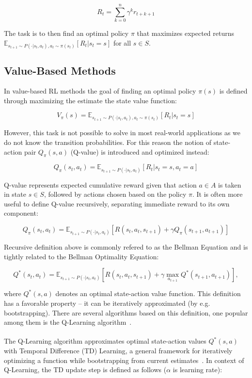 $$R_t = \sum\limits_{k=0}^n \gamma^k r_{t+k+1}$$

\noindent The task is to then find an optimal policy $\pi$ that maximizes expected returns $\mathbb{E}_{s_{t+1} \sim P(\cdot|s_t,a_t), a_t \sim \pi(s_t)}[R_t|s_t = s]$ for all $s \in S$.

\subsection{Value-Based Methods} \label{vbm}

In value-based RL methods the goal of finding an optimal policy $\pi(s)$ is defined through maximizing the estimate the state value function: 

$$V_\pi(s) = \mathbb{E}_{s_{t+1} \sim P(\cdot|s_t,a_t), a_t \sim \pi(s_t)}[R_t|s_t = s]$$

\noindent However, this task is not possible to solve in most real-world applications as we do not know the transition probabilities. For this reason the notion of state-action pair $Q_\pi(s,a)$ (Q-value) is introduced and optimized instead:

$$Q_\pi(s_t,a_t) = \mathbb{E}_{s_{t+1} \sim P(\cdot|s_t,a_t)}[R_t|s_t = s, a_t = a]$$

\noindent Q-value represents expected cumulative reward given that action $a \in A$ is taken in state $s \in S$, followed by actions chosen based on the policy $\pi$. It is often more useful to define Q-value recursively, separating immediate reward to its own component:

$$Q_\pi(s_t, a_t) = \mathbb{E}_{s_{t+1} \sim P(\cdot|s_t,a_t)}[R(s_t, a_t, s_{t+1}) + \gamma Q_\pi(s_{t+1}, a_{t+1})]$$

\noindent Recursive definition above is commonly refered to as the Bellman Equation and is tightly related to the Bellman Optimality Equation:

$$Q^*(s_t, a_t) = \mathbb{E}_{s_{t+1} \sim P(\cdot|s_t,a_t)}[R(s_t, a_t, s_{t+1}) + \gamma \max\limits_{a_{t+1}}Q^*(s_{t+1}, a_{t+1})], $$

\noindent where $Q^*(s, a)$ denotes an optimal state-action value function. This definition has a favorable property -- it can be iteratively approximated (by e.g. bootstrapping). There are several algorithms based on this definition, one popular among them is the Q-Learning algorithm~\cite{Watkins1992}.
\\\\
The Q-Learning algorithm approximates optimal state-action values $Q^*(s, a)$ with Temporal Difference (TD) Learning, a general framework for iteratively optimizing a function while bootstrapping from current estimates~\cite{Sutton1988}. In context of Q-Learning, the TD update step is defined as follows ($\alpha$ is learning rate):

